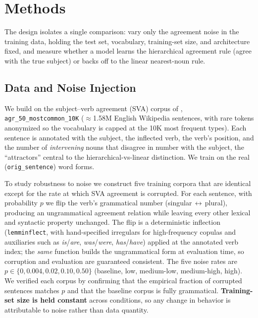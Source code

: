 \section{Methods}
\label{sec:methods}


The design isolates a single comparison: vary only the agreement noise in the
training data, holding the test set, vocabulary, training-set size, and
architecture fixed, and measure whether a model learns the hierarchical
agreement rule (agree with the true subject) or backs off to the linear
nearest-noun rule.

\subsection{Data and Noise Injection}
\label{sec:data}
We build on the subject--verb agreement (SVA) corpus of \citet{linzen2016},
\texttt{agr\_50\_mostcommon\_10K} ($\approx$1.58M English Wikipedia sentences,
with rare tokens anonymized so the vocabulary is capped at the 10K most frequent
types). Each sentence is annotated with the subject, the inflected verb, the
verb's position, and the number of \emph{intervening} nouns that disagree in
number with the subject, the ``attractors'' central to the
hierarchical-vs-linear distinction. We train on the real
(\texttt{orig\_sentence}) word forms.

To study robustness to noise we construct five training corpora that are
identical except for the rate at which SVA agreement is corrupted. For each
sentence, with probability $p$ we flip the verb's grammatical number
(singular\,$\leftrightarrow$\,plural), producing an ungrammatical agreement
relation while leaving every other lexical and syntactic property unchanged. The
flip is a deterministic inflection (\texttt{lemminflect}, with hand-specified
irregulars for high-frequency copulas and auxiliaries such as
\textit{is}/\textit{are}, \textit{was}/\textit{were}, \textit{has}/\textit{have})
applied at the annotated verb index; the \emph{same} function builds the
ungrammatical form at evaluation time, so corruption and evaluation are
guaranteed consistent. The five noise rates are
$p \in \{0, 0.004, 0.02, 0.10, 0.50\}$ (baseline, low, medium-low, medium-high,
high). We verified each corpus by confirming that the empirical fraction of
corrupted sentences matches $p$ and that the baseline corpus is fully
grammatical. \textbf{Training-set size is held constant} across conditions, so
any change in behavior is attributable to noise rather than data quantity.

